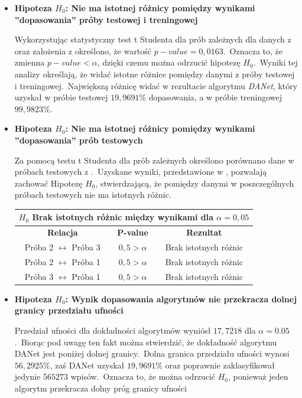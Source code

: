 \begin{itemize}
\item \textbf{Hipoteza $H_0$: Nie ma istotnej różnicy pomiędzy wynikami ''dopasowania'' próby testowej i treningowej}

Wykorzystując statystyczny test t Studenta dla prób zależnych dla danych z  oraz założenia z  określono, że wartość $p-value = 0,0163$.\ Oznacza to, że zmienna $p-value < \alpha$, dzięki czemu można odrzucić hipotezę $H_0$.\ Wyniki tej analizy określają, że widać istotne różnice pomiędzy danymi z próby testowej i treningowej.\ Największą różnicę widać w rezultacie algorytmu \textit{DANet}, który uzyskał w próbie testowej $19,9691\%$ dopasowania, a w próbie treningowej $99,9823\%$.\\

 \item \textbf{Hipoteza $H_0$: Nie ma istotnej różnicy pomiędzy wynikami ''dopasowania'' prób testowych}

Za pomocą testu t Studenta dla prób zależnych określono porównano dane w próbach testowych z .\ Uzyskane wyniki, przedstawione w , pozwalają zachować Hipotezę $H_0$, stwierdzającą, że pomiędzy danymi w poszczególnych próbach testowych nie ma istotnych różnic.

\begin{table}[H]
    \centering
   \begin{tabular}{|c|c|c|} \hline
       \multicolumn{3}{|c|}{$H_0$ Brak istotnych różnic między wynikami dla $\alpha = 0,05$} \\ \hline
       \textbf{Relacja} & \textbf{P-value} & \textbf{Rezultat} \\\hline
       Próba 2 $\leftrightarrow$ Próba 3 & $0,5 > \alpha$ & Brak istotnych różnic \\ \hline
       Próba 2 $\leftrightarrow$ Próba 1 & $0,5 > \alpha$ & Brak istotnych różnic \\ \hline
       Próba 3 $\leftrightarrow$ Próba 1 & $0,5 > \alpha$ & Brak istotnych różnic \\ \hline
   \end{tabular}
    \label{tab:acc-p-stat}
\end{table}

\item \textbf{Hipoteza $H_0$: Wynik dopasowania algorytmów nie przekracza dolnej granicy przedziału ufności}


Przedział ufności dla dokładności algorytmów wyniósł $17,7218$ dla $\alpha = 0.05$.\ Biorąc pod uwagę ten fakt można stwierdzić, że dokładność algorytmu DANet jest poniżej dolnej granicy.\ Dolna granica przedziału ufności wynosi $56,2925\%$, zaś DANet uzyskał $19,9691\%$ oraz poprawnie zaklasyfikował jedynie $565273$ wpisów.\ Oznacza to, że można odrzucić $H_0$, ponieważ jeden algorytm przekracza dolny próg granicy ufności

\end{itemize}
